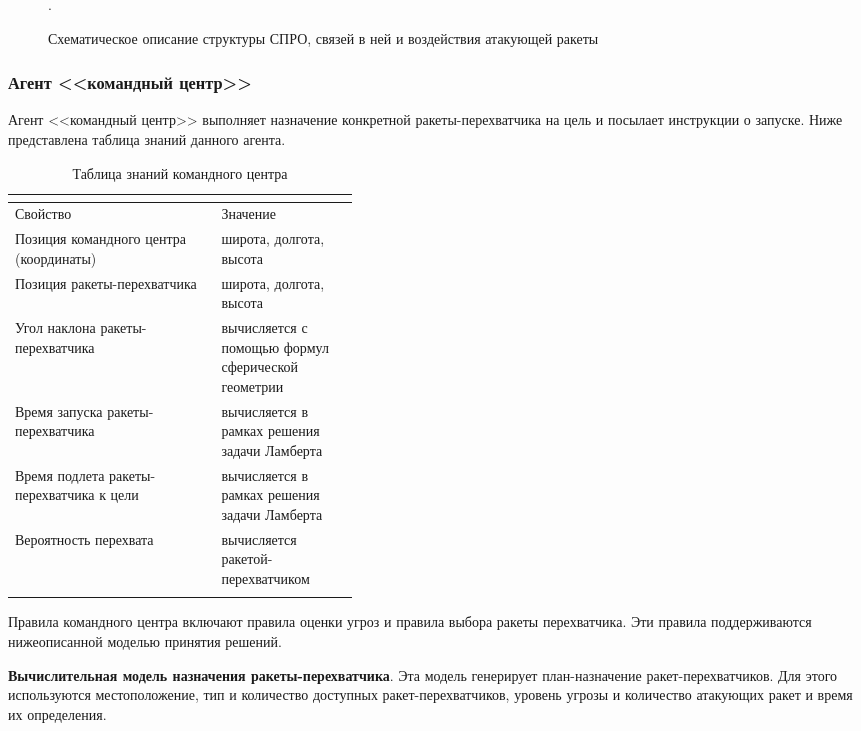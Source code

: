 \begin{figure*}[h!]
	\caption{Схематическое описание структуры СПРО, связей в ней и воздействия атакующей ракеты}.
\end{figure*} 


\pagebreak


\subsubsection{Агент <<командный центр>>}

Агент <<командный центр>> выполняет назначение конкретной ракеты-перехватчика на цель и посылает инструкции о запуске. Ниже представлена таблица знаний данного агента.

\begin{longtable}{|l|p{0.4\linewidth}|}
	\multicolumn{2}{l}{} \\
	\hline
	Свойство & Значение \\ \hline
	\endfirsthead
	\endhead
	Позиция командного центра (координаты)		& 	широта, долгота, высота	\\ \hline
	Позиция ракеты-перехватчика					&	широта, долгота, высота	\\ \hline 
	Угол наклона ракеты-перехватчика			&	вычисляется с помощью  формул сферической геометрии	     \\ \hline
	Время запуска ракеты-перехватчика			&	вычисляется в рамках решения задачи Ламберта          \\ \hline
	Время подлета ракеты-перехватчика к цели 	&	вычисляется в рамках решения задачи Ламберта         \\ \hline
	Вероятность перехвата						&  	вычисляется ракетой-перехватчиком	     \\ \hline 
	\caption{Таблица знаний командного центра}
	\label{tab:command_center_parameters}\\
\end{longtable}


Правила командного центра включают правила оценки угроз и правила выбора ракеты перехватчика. Эти правила поддерживаются нижеописанной моделью принятия решений.

\textbf{Вычислительная модель назначения ракеты-перехватчика}.
Эта модель генерирует план-назначение ракет-перехватчиков. Для этого используются  местоположение, тип и количество доступных ракет-перехватчиков, уровень угрозы и количество атакующих ракет и время их определения. 

